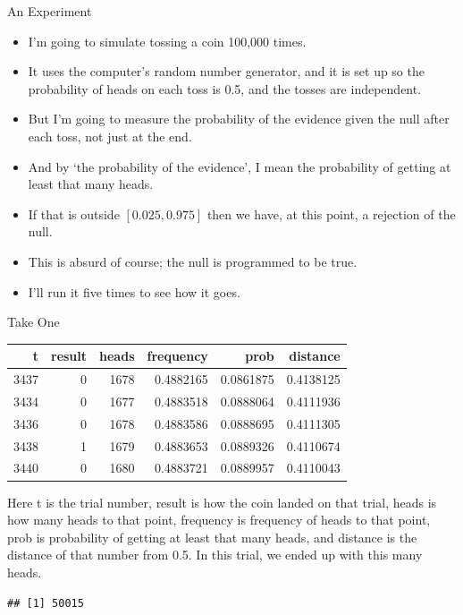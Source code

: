 \documentclass[
  ignorenonframetext,
]{beamer}
\providecommand{\tightlist}{%
  \setlength{\itemsep}{0pt}\setlength{\parskip}{0pt}}
\renewcommand{\,}{\text{, }}
\begin{document}
\begin{frame}{An Experiment}
\protect\hypertarget{an-experiment-1}{}

\begin{itemize}
\tightlist
\item
  I'm going to simulate tossing a coin 100,000 times.
\item
  It uses the computer's random number generator, and it is set up so
  the probability of heads on each toss is 0.5, and the tosses are
  independent.
\item
  But I'm going to measure the probability of the evidence given the
  null after each toss, not just at the end.
\item
  And by `the probability of the evidence', I mean the probability of
  getting at least that many heads.
\item
  If that is outside \([0.025, 0.975]\) then we have, at this point, a
  rejection of the null.
\item
  This is absurd of course; the null is programmed to be true.
\item
  I'll run it five times to see how it goes.
\end{itemize}

\end{frame}

\begin{frame}[fragile]{Take One}
\protect\hypertarget{take-one}{}

\begin{longtable}[]{@{}rrrrrr@{}}
\toprule
t & result & heads & frequency & prob & distance\tabularnewline
\midrule
\endhead
3437 & 0 & 1678 & 0.4882165 & 0.0861875 & 0.4138125\tabularnewline
3434 & 0 & 1677 & 0.4883518 & 0.0888064 & 0.4111936\tabularnewline
3436 & 0 & 1678 & 0.4883586 & 0.0888695 & 0.4111305\tabularnewline
3438 & 1 & 1679 & 0.4883653 & 0.0889326 & 0.4110674\tabularnewline
3440 & 0 & 1680 & 0.4883721 & 0.0889957 & 0.4110043\tabularnewline
\bottomrule
\end{longtable}

Here t is the trial number, result is how the coin landed on that trial,
heads is how many heads to that point, frequency is frequency of heads
to that point, prob is probability of getting at least that many heads,
and distance is the distance of that number from 0.5. In this trial, we
ended up with this many heads.

\begin{verbatim}
## [1] 50015
\end{verbatim}

\end{frame}
\end{document}
